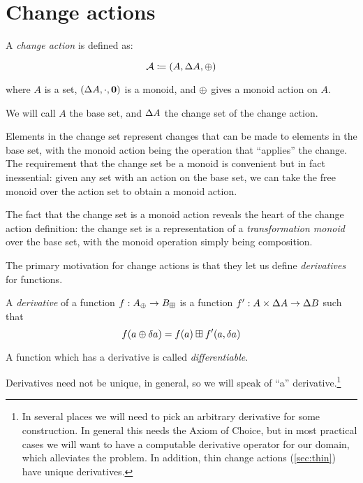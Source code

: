 \section{Change actions}
\label{sec:changeActions}

\begin{defn}
  A \textit{change action} is defined as:

  $$\mathcal{A} \coloneqq (A,\Delta A,\oplus)$$

  where $A$ is a set, $(\Delta A, \cdot, \textbf{0})$ is a monoid, and $\oplus$ gives a monoid action on $A$.

  We will call $A$ the base set, and $\Delta A$ the change set of the change action.
\end{defn}

Elements in the change set represent changes that can be made to elements in the
base set, with the monoid action being the operation that ``applies'' the
change. The requirement that the change set be a monoid is convenient but in
fact inessential: given any set with an action on the base set, we can take the
free monoid over the action set to obtain a monoid action.

The fact that the change set is a monoid action reveals the heart of the
change action definition: the change set is a representation of a
\textit{transformation monoid} over the base set, with the monoid
operation simply being composition.

The primary motivation for change actions is that they let us define
\textit{derivatives} for functions.

\begin{defn}[Derivatives]
  A \textit{derivative} of a function $f: A_\oplus \rightarrow B_\boxplus$ is a function $f': A \times \Delta A \rightarrow
  \Delta B$ such that
  $$f(a \oplus \delta a) = f(a) \boxplus f'(a, \delta a)$$

  A function which has a derivative is called \textit{differentiable}.
\end{defn}

Derivatives need not be unique, in general, so we will speak of ``a''
derivative.\footnote{In several places we will need to pick an arbitrary
  derivative for some construction. In general this needs the Axiom of Choice,
  but in most practical cases we will want to have a computable derivative
  operator for our domain, which alleviates the problem. In addition, thin
  change actions (\cref{sec:thin}) have unique derivatives.}

